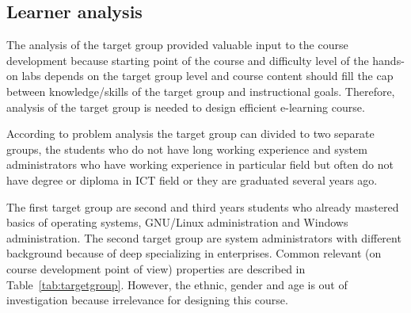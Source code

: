 \subsection{Learner analysis}


The analysis of the target group provided valuable input to the course development because starting point of the course and difficulty level of the hands-on labs depends on the target group level and course content should fill the cap between knowledge/skills of the target group and instructional goals. Therefore, analysis of the target group is needed to design efficient e-learning course.

 According to problem analysis the target group can divided to two separate groups, the students who do not have long working experience and system administrators who have working experience in particular field but often do not have degree or diploma in \gls{ICT} field or they are graduated several years ago.

The first target group are second and third years students who already mastered basics of operating systems, GNU/Linux administration and Windows administration. The second target group are system administrators with different background because of deep specializing in enterprises. Common relevant (on course development point of view)  properties are described in Table~\ref{tab:targetgroup}. However, the ethnic, gender and age is out of investigation because irrelevance for designing this course.

